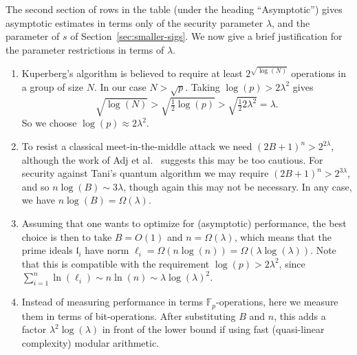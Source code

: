 \documentclass{llncs}
\newcommand{\F}{\mathbb{F}}
\renewcommand{\l}{\mathfrak{l}}
\begin{document}
The second section of rows in the table (under the heading ``Asymptotic'') gives asymptotic estimates in terms only of the security parameter $\lambda$, and the parameter of $s$ of Section~\ref{sec:smaller-sigs}.
We now give a brief justification for the parameter restrictions in terms of $\lambda$.
\begin{enumerate}
\item Kuperberg's algorithm is believed to require at least $ 2^{\sqrt{\log(N)}}$ operations in a group of size $N$. In our case $N > \sqrt{p}$. Taking $\log(p) > 2 \lambda^2$ gives 
\[
   \sqrt{ \log(N)} > \sqrt{ \tfrac{1}{2} \log(p) } > \sqrt{ \tfrac{1}{2} 2 \lambda^2 } = \lambda.
\]
So we choose $\log(p) \approx 2 \lambda^2$.

\item 
To resist a classical meet-in-the-middle attack we need $(2B+1)^n > 2^{2 \lambda}$, although the work of Adj  et al.~\cite{adj+menezes+al-isogenies} suggests this may be too cautious.
For security against Tani's quantum algorithm we may require $(2B+1)^n > 2^{3 \lambda}$, and so $n \log(B) \sim 3 \lambda$, though again this may not be necessary. In any case, we have $n \log(B) = \Omega( \lambda )$.



%

\item Assuming that one wants to optimize for (asymptotic) performance, the best choice is then to take $B=O(1)$ and $n=\Omega(\lambda)$, which means that the prime ideals $\l_i$ have norm $\ell_i = \Omega( n \log(n)) =  \Omega( \lambda \log(\lambda))$. Note that this is compatible with the requirement $\log(p)>2\lambda^2$, since $\sum_{i=1}^n\ln(\ell_i)\sim n\ln(n) \sim \lambda\log(\lambda)^2$.

\item Instead of measuring performance in terms $\F_p$-operations, here we measure them in terms of bit-operations. After substituting $B$ and $n$, this adds a factor $\lambda^2\log(\lambda)$ in front of the lower bound if using fast (quasi-linear complexity) modular arithmetic.

\end{enumerate}
\end{document}
